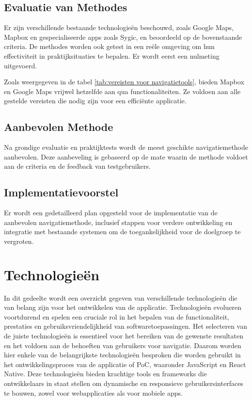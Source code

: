 \subsection{Evaluatie van Methodes}
Er zijn verschillende bestaande technologieën beschouwd, zoals Google Maps, Mapbox en gespecialiseerde apps zoals Sygic, en beoordeeld op de bovenstaande criteria. De methodes worden ook getest in een reële omgeving om hun effectiviteit in praktijksituaties te bepalen. Er wordt eerst een nulmeting uitgevoerd.

Zoals weergegeven in de tabel \ref{tab:vereisten voor navigatietools}, bieden Mapbox en Google Maps vrijwel hetzelfde aan qua functionaliteiten. Ze voldoen aan alle gestelde vereisten die nodig zijn voor een efficiënte applicatie.

\subsection{Aanbevolen Methode}
Na grondige evaluatie en praktijktests wordt de meest geschikte navigatiemethode aanbevolen. Deze aanbeveling is gebaseerd op de mate waarin de methode voldoet aan de criteria en de feedback van testgebruikers.

\subsection{Implementatievoorstel}
Er wordt een gedetailleerd plan opgesteld voor de implementatie van de aanbevolen navigatiemethode, inclusief stappen voor verdere ontwikkeling en integratie met bestaande systemen om de toegankelijkheid voor de doelgroep te vergroten.

\section{Technologieën}
\label{sec:technologieën}

In dit gedeelte wordt een overzicht gegeven van verschillende technologieën die van belang zijn voor het ontwikkelen van de applicatie. Technologieën evolueren voortdurend en spelen een cruciale rol in het bepalen van de functionaliteit, prestaties en gebruiksvriendelijkheid van softwaretoepassingen. Het selecteren van de juiste technologieën is essentieel voor het bereiken van de gewenste resultaten en het voldoen aan de behoeften van gebruikers voor navigatie. Daarom worden hier enkele van de belangrijkste technologieën besproken die worden gebruikt in het ontwikkelingsproces van de applicatie of PoC, waaronder JavaScript en React Native. Deze technologieën bieden krachtige tools en frameworks die ontwikkelaars in staat stellen om dynamische en responsieve gebruikersinterfaces te bouwen, zowel voor webapplicaties als voor mobiele apps.

